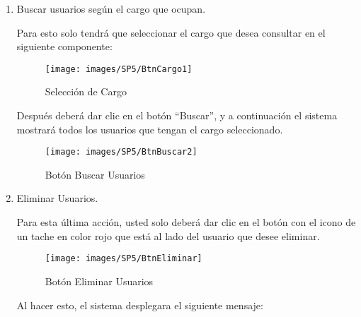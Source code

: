         \begin{enumerate}
        
            \item   Buscar usuarios según el cargo que ocupan.
        
                Para esto solo tendrá que seleccionar el cargo que desea consultar en el siguiente componente:
            
                \begin{figure}[!hbtp]
                    \centering
                    \hypertarget{cargo1}{\texttt{[image: images/SP5/BtnCargo1]}}
                    \caption{Selección de Cargo}
                    \label{cargo1}
                \end{figure}
            
                Después deberá dar clic en el botón “Buscar”, y a continuación el sistema mostrará todos los usuarios que tengan el cargo seleccionado.
                
                \begin{figure}[!hbtp]
                    \centering
                    \hypertarget{buscar}{\texttt{[image: images/SP5/BtnBuscar2]}}
                    \caption{Botón Buscar Usuarios}
                    \label{buscar}
                \end{figure}
                
            \item Eliminar Usuarios.
            
                Para esta última acción, usted solo deberá dar clic en el botón con el icono de un tache en color rojo que está al lado del usuario que desee  eliminar. 
            
                \begin{figure}[!hbtp]
                    \centering
                    \hypertarget{eliminar}{\texttt{[image: images/SP5/BtnEliminar]}}
                    \caption{Botón Eliminar Usuarios}
                    \label{eliminar}
                \end{figure}
            
                Al hacer esto, el sistema desplegara el siguiente mensaje:
                
            

\end{enumerate}
